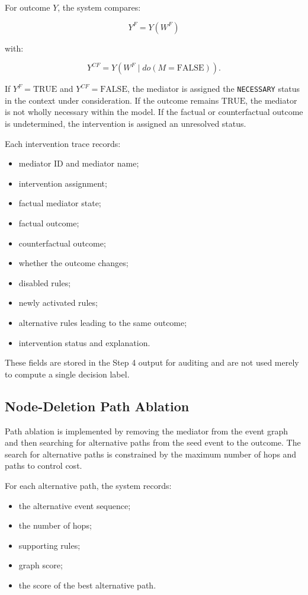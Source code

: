 For outcome \(Y\), the system compares:

\[
Y^{F}
=
Y
\left(
W^{F}
\right)
\]

with:

\[
Y^{CF}
=
Y
\left(
W^{F}
\mid
do(M=\mathrm{FALSE})
\right).
\]

If \(Y^{F}=\mathrm{TRUE}\) and \(Y^{CF}=\mathrm{FALSE}\), the mediator is
assigned the \texttt{NECESSARY} status in the context under consideration.
If the outcome remains \(\mathrm{TRUE}\), the mediator is not wholly
necessary within the model. If the factual or counterfactual outcome is
undetermined, the intervention is assigned an unresolved status.

Each intervention trace records:

\begin{itemize}
    \item mediator ID and mediator name;
    \item intervention assignment;
    \item factual mediator state;
    \item factual outcome;
    \item counterfactual outcome;
    \item whether the outcome changes;
    \item disabled rules;
    \item newly activated rules;
    \item alternative rules leading to the same outcome;
    \item intervention status and explanation.
\end{itemize}

These fields are stored in the Step 4 output for auditing and are not used
merely to compute a single decision label.

\subsection{Node-Deletion Path Ablation}

Path ablation is implemented by removing the mediator from the event graph
and then searching for alternative paths from the seed event to the outcome.
The search for alternative paths is constrained by the maximum number of
hops and paths to control cost.

For each alternative path, the system records:

\begin{itemize}
    \item the alternative event sequence;
    \item the number of hops;
    \item supporting rules;
    \item graph score;
    \item the score of the best alternative path.
\end{itemize}

